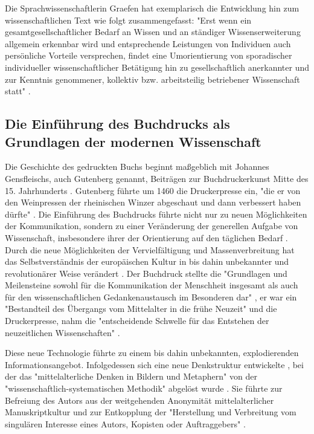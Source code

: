Die Sprachwissenschaftlerin Graefen hat exemplarisch die Entwicklung hin zum wissenschaftlichen Text wie folgt zusammengefasst: "Erst wenn ein gesamtgesellschaftlicher Bedarf an Wissen und an ständiger Wissenserweiterung allgemein erkennbar wird und entsprechende Leistungen von Individuen auch persönliche Vorteile versprechen, findet eine Umorientierung von sporadischer individueller wissenschaftlicher Betätigung hin zu gesellschaftlich anerkannter und zur Kenntnis genommener, kollektiv bzw. arbeitsteilig betriebener Wissenschaft statt" \cite{graefen2007_wissenschaftliche_artikel}.

\subsection{Die Einführung des Buchdrucks als Grundlagen der modernen Wissenschaft}

Die Geschichte des gedruckten Buchs beginnt maßgeblich mit Johannes Gensfleischs, auch Gutenberg genannt, Beiträgen zur Buchdruckerkunst \cite{wittmann_1999_geschichte} Mitte des 15. Jahrhunderts \cite{suchen}. Gutenberg führte um 1460 die Druckerpresse ein, "die er von den Weinpressen der rheinischen Winzer abgeschaut und dann verbessert haben dürfte" \cite{stober_2014_pressegeschichte}. Die Einführung des Buchdrucks führte nicht nur zu neuen Möglichkeiten der Kommunikation, sondern zu einer Veränderung der generellen Aufgabe von Wissenschaft, insbesondere ihrer der Orientierung auf den täglichen Bedarf \cite{Luhmann1998}. Durch die neue Möglichkeiten der Vervielfältigung und Massenverbreitung hat das Selbstverständnis der europäischen Kultur in bis dahin unbekannter \cite{giesecke_1991_buchdruck} und revolutionärer Weise verändert \cite{wunderlich_2008_buchdruck} \cite{stober_2014_pressegeschichte}. Der Buchdruck stellte die "Grundlagen und Meilensteine sowohl für die Kommunikation der Menschheit insgesamt als auch für den wissenschaftlichen Gedankenaustausch im Besonderen dar" \cite{schirmbacher_2009_wisspub}, er war ein "Bestandteil des Übergangs vom Mittelalter in die frühe Neuzeit" \cite{lange2008medienwettbewerb} und die Druckerpresse, nahm die "entscheidende Schwelle für das Entstehen der neuzeitlichen Wissenschaften" \cite{luhmann_1997_gesellschaft}.

Diese neue Technologie führte zu einem bis dahin unbekannten, explodierenden Informationsangebot. Infolgedessen sich eine neue Denkstruktur entwickelte \cite{eisenstein_1997_druckerpresse}, bei der das "mittelalterliche Denken in Bildern und Metaphern" von der "wissenschaftlich-systematischen Methodik" abgelöst wurde \cite{wunderlich_2008_buchdruck}. Sie führte zur Befreiung des Autors aus der weitgehenden Anonymität mittelalterlicher Manuskriptkultur und zur Entkopplung der "Herstellung und Verbreitung vom singulären Interesse eines Autors, Kopisten oder Auftraggebers"\cite{wunderlich_2008_buchdruck} \cite{schirmbacher_2009_wisspub}.

